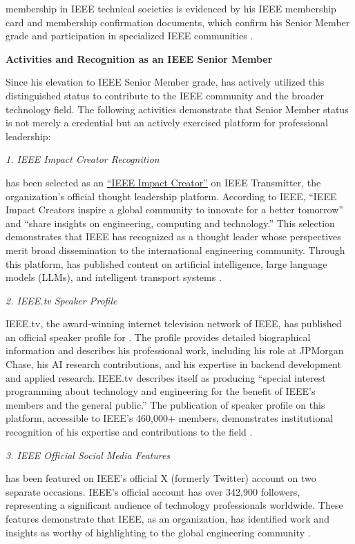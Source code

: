 \drs membership in IEEE technical societies is evidenced by his IEEE membership card and membership confirmation documents, which confirm his Senior Member grade and participation in specialized IEEE communities \cite{ieeemembercard, ieeeypmember}.

\textbf{Activities and Recognition as an IEEE Senior Member}

Since his elevation to IEEE Senior Member grade, \dr has actively utilized this distinguished status to contribute to the IEEE community and the broader technology field. The following activities demonstrate that \drs Senior Member status is not merely a credential but an actively exercised platform for professional leadership:

\textit{1. IEEE Impact Creator Recognition}

\dr has been selected as an \underline{``IEEE Impact Creator''} on IEEE Transmitter, the organization's official thought leadership platform. According to IEEE, ``IEEE Impact Creators inspire a global community to innovate for a better tomorrow'' and ``share insights on engineering, computing and technology.'' This selection demonstrates that IEEE has recognized \dr as a thought leader whose perspectives merit broad dissemination to the international engineering community. Through this platform, \dr has published content on artificial intelligence, large language models (LLMs), and intelligent transport systems \cite{PM2}.

\textit{2. IEEE.tv Speaker Profile}

IEEE.tv, the award-winning internet television network of IEEE, has published an official speaker profile for \dr. The profile provides detailed biographical information and describes his professional work, including his role at JPMorgan Chase, his AI research contributions, and his expertise in backend development and applied research. IEEE.tv describes itself as producing ``special interest programming about technology and engineering for the benefit of IEEE's members and the general public.'' The publication of \drs speaker profile on this platform, accessible to IEEE's 460,000+ members, demonstrates institutional recognition of his expertise and contributions to the field \cite{PM3}.

\textit{3. IEEE Official Social Media Features}

\dr has been featured on IEEE's official X (formerly Twitter) account on two separate occasions. IEEE's official account has over 342,900 followers, representing a significant audience of technology professionals worldwide. These features demonstrate that IEEE, as an organization, has identified \drs work and insights as worthy of highlighting to the global engineering community \cite{PM4}.

